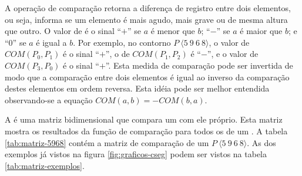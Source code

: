 A operação de comparação  retorna a diferença de registro
entre dois elementos, ou seja, informa se um elemento é mais agudo,
mais grave ou de mesma altura que outro. O valor de  é o
sinal ``$+$'' se $a$ é menor que $b$; ``$-$'' se $a$ é maior que $b$;
e ``$0$'' se $a$ é igual a $b$. Por exemplo, no contorno
$P\:\langle5\:9\:6\:8\rangle$, o valor de $COM(P_0,P_1)$ é o sinal
``$+$'', o de $COM(P_1,P_2)$ é ``$-$'', e o valor de $COM(P_3,P_0)$ é
o sinal ``$+$''. Esta medida de comparação pode ser invertida de modo
que a comparação entre dois elementos é igual ao inverso da comparação
destes elementos em ordem reversa. Esta idéia pode ser melhor
entendida observando-se a equação $COM(a,b)=-COM(b,a)$.

A  é uma matriz bidimensional que compara um
 com ele próprio. Esta matriz mostra os resultados da
função de comparação  para todos os  de um
. A tabela \ref{tab:matriz-5968} contém a matriz de
comparação de um  $P\:\langle5\:9\:6\:8\rangle$. As
 dos exemplos já vistos na figura
\ref{fig:graficos-cseg} podem ser vistos na tabela
\ref{tab:matriz-exemplos}.

\begin{table}
  \centering
  \qquad
  \qquad
  \caption{Exemplos de }
  \label{tab:matriz-exemplos}
\end{table}

